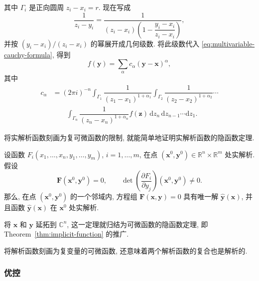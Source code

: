 其中 $\Gamma_i$ 是正向圆周 $z_i-x_i=r$. 现在写成
\begin{equation}\label{eq:cauchy-kernel-geometric-factorization}
\dfrac1{z_i-y_i}=\dfrac1{(z_i-x_i)\left(1-\dfrac{y_i-x_i}{z_i-x_i}\right)},
\end{equation}
并按 $(y_i-x_i)/(z_i-x_i)$ 的幂展开成几何级数. 将此级数代入 \eqref{eq:multivariable-cauchy-formula}, 得到
\begin{equation}\label{eq:complex-restriction-taylor-series}
f(\bm{y})=\sum_\alpha c_\alpha(\bm{y}-\bm{x})^\alpha,
\end{equation}
其中
\begin{equation}\label{eq:complex-restriction-taylor-coefficients}
\begin{aligned}
c_\alpha&=(2\pi i)^{-n}\int_{\Gamma_1}\dfrac1{(z_1-x_1)^{1+\alpha_1}}\int_{\Gamma_2}\dfrac1{(z_2-x_2)^{1+\alpha_2}}\cdots\\
&\qquad\int_{\Gamma_n}\dfrac1{(z_n-x_n)^{1+\alpha_n}}f(\bm{z})\,\mathrm{d}z_n\,\mathrm{d}z_{n-1}\cdots\mathrm{d}z_1.
\end{aligned}
\end{equation}


将实解析函数刻画为复可微函数的限制, 就能简单地证明实解析函数的隐函数定理.

\begin{Theorem}
\label{thm:real-analytic-implicit-function}
设函数 $F_i(x_1,\ldots,x_n,y_1,\ldots,y_m)$, $i=1,\ldots,m$, 在点 $(\bm{x}^0,\bm{y}^0)\in\mathbb{R}^n\times\mathbb{R}^m$ 处实解析. 假设
\begin{equation}\label{eq:analytic-implicit-function-hypothesis}
\bm{F}(\bm{x}^0,\bm{y}^0)=0,\qquad\det\left(\dfrac{\partial F_i}{\partial y_j}\right)(\bm{x}^0,\bm{y}^0)\ne0.
\end{equation}
那么, 在点 $(\bm{x}^0,\bm{y}^0)$ 的一个邻域内, 方程组 $\bm{F}(\bm{x},\bm{y})=0$ 具有唯一解 $\hat{\bm{y}}(\bm{x})$, 并且函数 $\hat{\bm{y}}(\bm{x})$ 在 $\bm{x}^0$ 处实解析.
\end{Theorem}

将 $\bm{x}$ 和 $\bm{y}$ 延拓到 $\mathbb{C}^n$, 这一定理就归结为可微函数的隐函数定理, 即 Theorem~\ref{thm:implicit-function} 的推广.

将解析函数刻画为复变量的可微函数, 还意味着两个解析函数的复合也是解析的.

\subsubsection{优控}\label{subsec:majorization}

